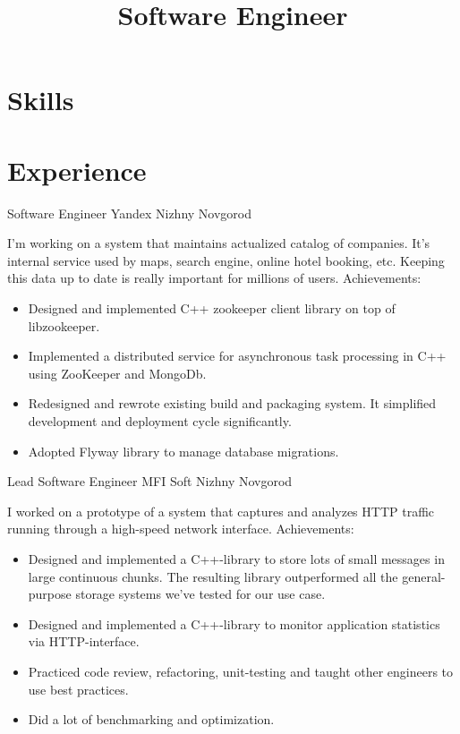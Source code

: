 \documentclass[11pt,a4paper,sans]{moderncv}
\title{Software Engineer}
\begin{document}
\makecvtitle

\section{Skills}

\section{Experience}
{Software Engineer}
{Yandex}
{Nizhny Novgorod}
{}
{I'm working on a system that maintains actualized catalog of
companies.  It's internal service used by maps, search engine, online
hotel booking, etc.  Keeping this data up to date is really important
for millions of users.
\newline{}
Achievements:
\begin{itemize}
\item Designed and implemented C++ zookeeper client library on top of
  libzookeeper.
\item Implemented a distributed service for asynchronous task
  processing in C++ using ZooKeeper and MongoDb.
\item Redesigned and rewrote existing build and packaging system. It
  simplified development and deployment cycle significantly.
\item Adopted Flyway library to manage database migrations.
\end{itemize}
}

{Lead Software Engineer}
{MFI Soft}
{Nizhny Novgorod}
{}
{I worked on a prototype of a system that captures and analyzes HTTP
traffic running through a high-speed network interface.
\newline{}
Achievements:
\begin{itemize}
\item Designed and implemented a C++-library to store lots of small
  messages in large continuous chunks. The resulting library
  outperformed all the general-purpose storage systems we've tested
  for our use case.
\item Designed and implemented a C++-library to monitor application
  statistics via HTTP-interface.
\item Practiced code review, refactoring, unit-testing and taught
  other engineers to use best practices.
\item Did a lot of benchmarking and optimization.
\end{itemize}
}
\end{document}

